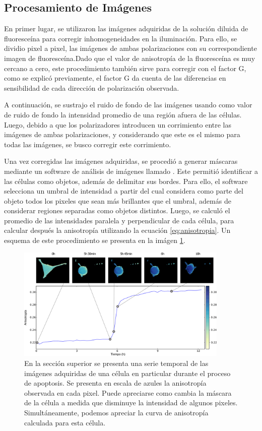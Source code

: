 \subsection{Procesamiento de Imágenes}

En primer lugar, se utilizaron las imágenes adquiridas de la solución diluida de fluoresceína para corregir inhomogeneidades en la iluminación. Para ello, se dividio pixel a pixel, las imágenes de ambas polarizaciones con su correspondiente imagen de fluoresceína.Dado que el valor de anisotropía de la fluoresceína es muy cercano a cero, este procedimiento también sirve para corregir con el factor G, como se explicó previamente, el factor G da cuenta de las diferencias en sensibilidad de cada dirección de polarización observada.

A continuación, se sustrajo el ruido de fondo de las imágenes usando como valor de ruido de fondo la intensidad promedio de una región afuera de las células. Luego, debido a que los polarizadores introducen un corrimiento entre las imágenes de ambas polarizaciones, y considerando que este es el mismo para todas las imágenes, se busco corregir este corrimiento.

Una vez corregidas las imágenes adquiridas, se procedió a generar máscaras mediante un software de análisis de imágenes llamado . Este permitió identificar a las células como objetos, además de delimitar sus bordes. Para ello, el software selecciona un umbral de intensidad a partir del cual considera como parte del objeto todos los pixeles que sean más brillantes que el umbral, además de considerar regiones separadas como objetos distintos. Luego, se calculó el promedio de las intensidades paralela y perpendicular de cada célula, para calcular después la anisotropía utilizando la ecuación \ref{eq:anisotropia}. Un esquema de este procedimiento se presenta en la imágen \ref{fig:esqexp}.

\begin{figure}
    \centering
    \includegraphics[width=0.9\textwidth]{./img/Cap4/EsqExp.png}
    \caption{En la sección superior se presenta una serie temporal de las imágenes adquiridas de una célula en particular durante el proceso de apoptosis. Se presenta en escala de azules la anisotropía observada en cada pixel. Puede apreciarse como cambia la máscara de la célula a medida que disminuye la intensidad de algunos pixeles. Simultáneamente, podemos apreciar la curva de anisotropía calculada para esta célula.}
    \label{fig:esqexp}
\end{figure}


